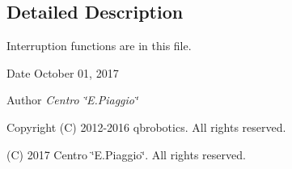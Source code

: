 \subsection{Detailed Description}
Interruption functions are in this file. 

\begin{DoxyDate}{Date}
October 01, 2017 
\end{DoxyDate}
\begin{DoxyAuthor}{Author}
{\itshape Centro \char`\"{}\+E.\+Piaggio\char`\"{}} 
\end{DoxyAuthor}
\begin{DoxyCopyright}{Copyright}
(C) 2012-\/2016 qbrobotics. All rights reserved. 

(C) 2017 Centro \char`\"{}\+E.\+Piaggio\char`\"{}. All rights reserved. 
\end{DoxyCopyright}
